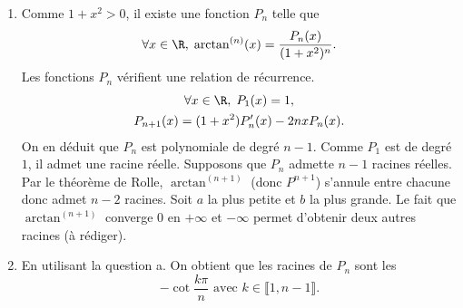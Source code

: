 \begin{enumerate}
 \item Comme $1+x^2 >0$, il existe une fonction $P_n$ telle que 
\begin{displaymath}
 \forall x \in \R, \; \arctan^{(n)}(x) =
\frac{P_n(x)}{(1+x^2)^n}.
\end{displaymath}
Les fonctions $P_n$ vérifient une relation de récurrence.
\begin{multline*}
 \forall x\in \R, \; P_1(x) = 1, \\
P_{n+1}(x) = (1+x^2)P'_n(x) - 2nxP_n(x).
\end{multline*}
On en déduit que $P_n$ est polynomiale de degré $n-1$.\newline
Comme $P_1$ est de degré $1$, il admet une racine réelle. Supposons que $P_n$ admette $n-1$ racines réelles. Par le théorème de Rolle, $\arctan^{(n+1)}$ (donc $P^{n+1}$) s'annule entre chacune donc admet $n-2$ racines. Soit $a$ la plus petite et $b$ la plus grande. Le fait que $\arctan^{(n+1)}$ converge $0$ en $+\infty$ et $-\infty$ permet d'obtenir deux autres racines (à rédiger).
 
 \item En utilisant la question a. On obtient que les racines de $P_n$ sont les 
\begin{displaymath}
 -\cot \frac{k\pi}{n} \text{ avec } k \in \llbracket 1, n-1 \rrbracket.
\end{displaymath}

\end{enumerate}
